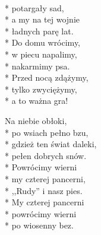 \begin{lyrics}[longestline={\vin ,,Rudy'' i nasz pies.}]

\\*
potargały sad,\\*
a my na tej wojnie\\*
ładnych parę lat.\\*
\smallskip
\vin Do domu wrócimy,\\*
\vin w piecu napalimy,\\*
\vin nakarmimy psa.\\*
\vin Przed nocą zdążymy,\\*
\vin tylko zwyciężymy,\\*
\vin a to ważna gra!

Na niebie obłoki,\\*
po wsiach pełno bzu,\\*
gdzież ten świat daleki,\\*
pełen dobrych snów.\\*
\smallskip
\vin Powrócimy wierni\\*
\vin my czterej pancerni,\\*
\vin ,,Rudy'' i nasz pies.\\*
\vin My czterej pancerni\\*
\vin powrócimy wierni\\*
\vin po wiosenny bez.
\end{lyrics}




